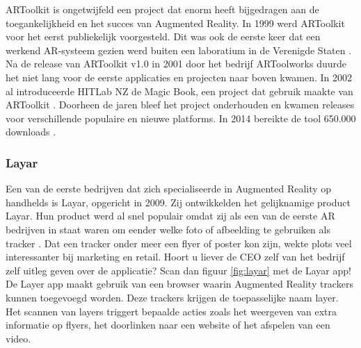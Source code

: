 \documentclass[pdftex,a4paper,12pt,twoside]{report}
\begin{document}
ARToolkit is ongetwijfeld een project dat enorm heeft bijgedragen aan de toegankelijkheid en het succes van Augmented Reality. In 1999 werd ARToolkit voor het eerst publiekelijk voorgesteld. Dit was ook de eerste keer dat een werkend AR-systeem gezien werd buiten een laboratium in de Verenigde Staten \citep{artoolkit}. Na de release van ARToolkit v1.0 in 2001 door het bedrijf ARToolworks duurde het niet lang voor de eerste applicaties en projecten naar boven kwamen. In 2002 al introduceerde HITLab NZ de Magic Book, een project dat gebruik maakte van ARToolkit \citep{billinghurst2001magicbook}. Doorheen de jaren bleef het project onderhouden en kwamen releases voor verschillende populaire en nieuwe platforms. In 2014 bereikte de tool 650.000 downloads \citep{artoolkit}.


\subsubsection{Layar}
Een van de eerste bedrijven dat zich specialiseerde in Augmented Reality op handhelds is Layar, opgericht in 2009. Zij ontwikkelden het gelijknamige product Layar. Hun product werd al snel populair omdat zij als een van de eerste AR bedrijven in staat waren om eender welke foto of afbeelding te gebruiken als tracker \citep{layarnumbers}. Dat een tracker onder meer een flyer of poster kon zijn, wekte plots veel interessanter bij marketing en retail. Hoort u liever de CEO zelf van het bedrijf zelf uitleg geven over de applicatie? Scan dan figuur \ref{fig:layar} met de Layar app! De Layer app maakt gebruik van een browser waarin Augmented Reality trackers kunnen toegevoegd worden. Deze trackers krijgen de toepasselijke naam layer. Het scannen van layers triggert bepaalde acties zoals het weergeven van extra informatie op flyers, het doorlinken naar een website of het afspelen van een video. \\
\end{document}
